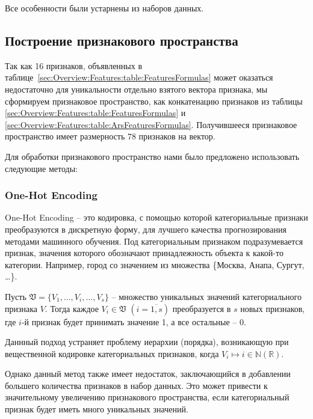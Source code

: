 \documentclass[12pt]{article}
\begin{document}
    \noindent Все особенности были устарнены из наборов данных.


    \subsection{Построение признакового пространства}
    \label{sec:Research:FeatureSpace}

    \par Так как 16 признаков, объявленных в таблице~\ref{sec:Overview:Features:table:FeaturesFormulas} может оказаться недостаточно для уникальности отдельно взятого вектора признака, мы сформируем признаковое пространство, как конкатенацию признаков из таблицы \ref{sec:Overview:Features:table:FeaturesFormulas} и \ref{sec:Overview:Features:table:ArsFeaturesFormulas}. Получившееся признаковое пространство имеет размерность 78 признаков на вектор.

    \par Для обработки признакового пространство нами было предложено использовать следующие методы:

    \subsubsection{One-Hot Encoding}
    \label{sec:Research:FeatureSpace:OneHotEncoding}

    \par One-Hot Encoding -- это кодировка, с помощью которой категориальные признаки преобразуются в дискретную форму, для лучшего качества прогнозирования методами машинного обучения. Под категориальным признаком подразумевается признак, значения которого обозначают принадлежность объекта к какой-то категории. Например, город со значением из множества \{Москва, Анапа, Сургут, \ldots\}.

    \par Пусть $ \mathfrak{V} = \{V_1, \ldots, V_i, \ldots, V_s\} $ -- множество уникальных значений категориального признака $V$. Тогда каждое $V_i \in \mathfrak{V}$ $(i = \overline{1,s})$ преобразуется в $s$ новых признаков, где $i$-й признак будет принимать значение 1, а все остальные -- 0.

    \par Даннный подход устраняет проблему иерархии (порядка), возникающую при вещественной кодировке категориальных признаков, когда $V_i \mapsto i \in \mathbb{N}(\mathbb{R})$.

    \par Однако данный метод также имеет недостаток, заключающийся в добавлении большего количества признаков в набор данных. Это может привести к значительному увеличению признакового пространства, если категориальный признак будет иметь много уникальных значений.
    
\end{document}
